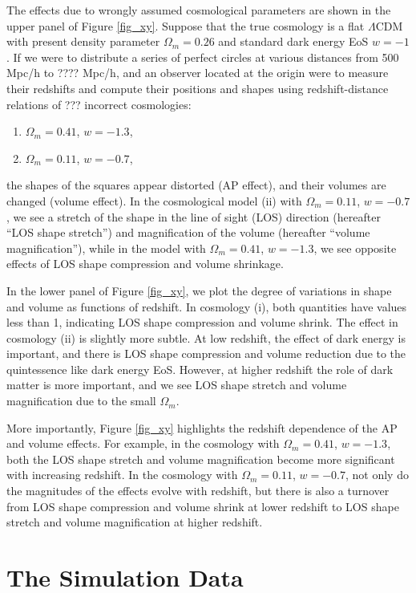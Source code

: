 \documentclass[iop]{emulateapj}
\begin{document}
The effects due to wrongly assumed cosmological parameters are shown in the upper panel of Figure \ref{fig_xy}.
Suppose that the true cosmology is a flat $\Lambda$CDM with present density parameter $\Omega_m=0.26$
and standard dark energy EoS $w=-1$.
If we were to distribute a series of perfect circles at various distances from 500 Mpc/h to ???? Mpc/h,
and an observer located at the origin were to measure their redshifts and compute their positions and shapes 
using redshift-distance relations of ??? incorrect cosmologies:
\begin{enumerate}
 \item $\Omega_m=0.41$, $w=-1.3$,
 \item $\Omega_m=0.11$, $w=-0.7$,
\end{enumerate}
the shapes of the squares appear distorted (AP effect),
and their volumes are changed (volume effect).
In the cosmological model (ii) with $\Omega_m=0.11$, $w=-0.7$, we see a stretch of the shape in the line of sight (LOS) direction (hereafter ``LOS shape stretch'')
and magnification of the volume (hereafter ``volume magnification''), 
while in the model with $\Omega_m=0.41$, $w=-1.3$, we see opposite effects of LOS shape compression and volume shrinkage.


In the lower panel of Figure \ref{fig_xy}, we plot the degree of variations in shape and volume as functions of redshift. 
In cosmology (i), both quantities have values less than 1, 
indicating LOS shape compression and volume shrink.
The effect in cosmology (ii) is slightly more subtle. At low redshift, the effect of dark energy is important, 
and there is LOS shape compression and volume reduction due to the quintessence like dark energy EoS.
However, at higher redshift the role of dark matter is more important, and we see LOS shape stretch and volume magnification due to the small $\Omega_m$.

More importantly, Figure \ref{fig_xy} highlights the redshift dependence of the AP and volume effects. 
For example, in the cosmology with $\Omega_m=0.41$, $w=-1.3$, 
both the LOS shape stretch and volume magnification become more significant with increasing redshift.
In the cosmology with $\Omega_m=0.11$, $w=-0.7$,
not only do the magnitudes of the effects evolve with redshift,
but there is also a turnover from LOS shape compression and volume shrink at lower redshift to LOS shape stretch and volume magnification at higher redshift.



\section{The Simulation Data}\label{sec:data}
\end{document}
